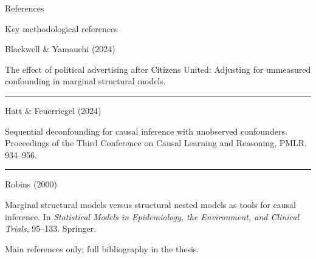 \documentclass[aspectratio=169,12pt]{beamer}
\newcommand{\teal}[1]{\textcolor{PrimerTeal}{#1}}
\newcommand{\muted}[1]{\textcolor{PrimerMuted}{#1}}
\begin{document}
\begin{frame}{References}

\vspace{-0.05cm}

{\fontsize{10.8}{13.5}\selectfont\teal{Key methodological references}}\par

\vspace{0.30cm}

{\fontsize{8.15}{10.6}\selectfont
\RaggedRight

\noindent
\textcolor{PrimerTeal}{Blackwell \& Yamauchi (2024)}\par
\muted{The effect of political advertising after Citizens United: Adjusting for unmeasured confounding in marginal structural models.}

\vspace{0.22cm}
\textcolor{PrimerRule}{\rule{\linewidth}{0.35pt}}

\vspace{0.22cm}
\noindent
\textcolor{PrimerTeal}{Hatt \& Feuerriegel (2024)}\par
\muted{Sequential deconfounding for causal inference with unobserved confounders. 
Proceedings of the Third Conference on Causal Learning and Reasoning, PMLR, 934--956.}

\vspace{0.22cm}
\textcolor{PrimerRule}{\rule{\linewidth}{0.35pt}}

\vspace{0.22cm}
\noindent
\textcolor{PrimerTeal}{Robins (2000)}\par
\muted{Marginal structural models versus structural nested models as tools for causal inference. 
In \textit{Statistical Models in Epidemiology, the Environment, and Clinical Trials}, 95--133. Springer.}

}

\vfill

{\fontsize{6.4}{8.0}\selectfont
\muted{Main references only; full bibliography in the thesis.}
}

\end{frame}
\end{document}
